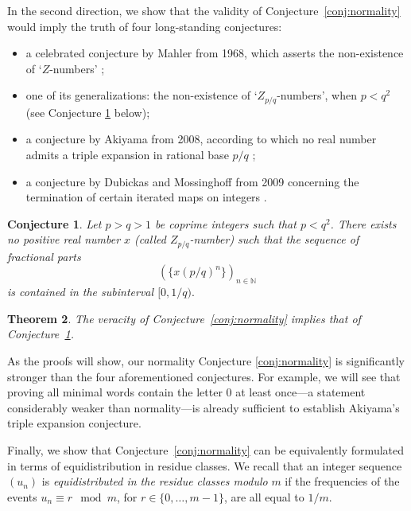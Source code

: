 \documentclass{template_arxiv}
\newtheorem{theorem}{Theorem}[section]
\newtheorem{conjecture}[theorem]{Conjecture}
\numberwithin{equation}{section}
\newcommand{\N}{\mathbb N}
\begin{document}
In the second direction, we show that the validity of  Conjecture~\ref{conj:normality} would imply the truth of four long-standing conjectures:
\begin{itemize}
    \item[-] a celebrated conjecture by Mahler from 1968, which asserts the non-existence of `$Z$-numbers' \cite{Mah68};
    
    \item[-] one of its generalizations: the non-existence of `$Z_{p/q}$-numbers', when $p<q^2$ (see Conjecture \ref{conj:mahler_generalized} below);
    
    \item[-] a conjecture by Akiyama from 2008, according to which no real number admits a triple expansion in rational base $p/q$ \cite{Aki08};
    
    \item[-] a conjecture by Dubickas and Mossinghoff from 2009 concerning the termination of certain iterated maps on integers \cite{DM09}.
\end{itemize}



\begin{conjecture}%
	\label{conj:mahler_generalized} Let $p>q> 1$ be coprime integers such that  $p< q^2$. There exists no positive real number $x$ (called \emph{$Z_{p/q}$-number}) such that the sequence of fractional parts
	\[(\{x(p/q)^n\})_{n\in \N}\]
	is contained in the subinterval $[0,1/q).$
\end{conjecture}




\begin{theorem}\label{th:impliesMahler} The veracity of Conjecture~\ref{conj:normality} implies that of Conjecture~\ref{conj:mahler_generalized}.
\end{theorem}


As the proofs will show, our normality Conjecture \ref{conj:normality} is significantly stronger than the four aforementioned conjectures. For example, we will see that proving all minimal words contain the letter $0$ at least once---a statement considerably weaker than normality---is already sufficient to establish Akiyama's triple expansion conjecture.

\medskip
Finally,  we show that Conjecture~\ref{conj:normality} can be equivalently formulated in terms of equidistribution in residue classes. We recall that an integer sequence $(u_n)$ is \emph{equidistributed in the residue classes modulo} $m$ if  the frequencies of the events $u_n \equiv r \mod m$, for $r \in \{0,\dots,m-1\}$, are all equal to $1/m$.
\end{document}
